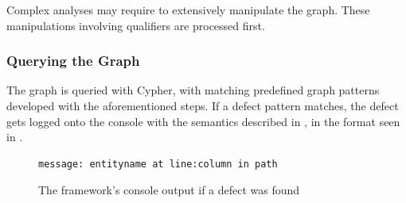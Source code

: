 Complex analyses may require to extensively manipulate the graph. These manipulations involving qualifiers are processed first.


\subsubsection{Querying the Graph}

The graph is queried with Cypher, with matching predefined graph patterns developed with the aforementioned steps. If a defect pattern matches, the defect gets logged onto the console with the semantics described in , in the format seen in .

\begin{figure}[!htb]
	\centering
	\begin{lstlisting}[language=Rifle, aboveskip=0em, belowskip=0em]
				message: entityname at line:column in path
	\end{lstlisting}
  \caption{The framework's console output if a defect was found}
  \label{fig:defect-found-logger}
\end{figure}